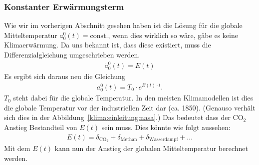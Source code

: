 \begin{refsection}
\subsubsection{Konstanter Erwärmungsterm
\label{klima:subsubsection:erwaermungsterm}}
Wie wir im vorherigen Abschnitt gesehen haben ist die Lösung für die globale Mitteltemperatur $a^0_0(t)=\text{const.}$, wenn dies wirklich so wäre, gäbe es keine Klimaerwärmung. Da uns bekannt ist, dass diese existiert, muss die Differenzialgleichung umgeschrieben werden.
\begin{align}
\dot a^0_0(t)=E(t)
\end{align}
Es ergibt sich daraus neu die Gleichung
\begin{align}
a^0_0(t)=T_0 \cdot e^{E(t)\cdot t}.
\end{align}
$T_0$ steht dabei für die globale Temperatur. In den meisten Klimamodellen ist dies die globale Temperatur vor der industriellen Zeit dar (ca. 1850). (Genauso verhält sich dies in der Abbildung~\ref{klima:einleitung:nasa}.) Das bedeutet dass der CO$_2$ Anstieg Bestandteil von $E(t)$ sein muss. Dies könnte wie folgt aussehen:
\begin{align}
E(t)=\delta_{\text{CO}_2}+\delta_{\text{Methan}}+\delta_{\text{Wasserdampf}}+...
\end{align}
Mit dem $E(t)$ kann nun der Anstieg der globalen Mitteltemperatur berechnet werden.


\end{refsection}
